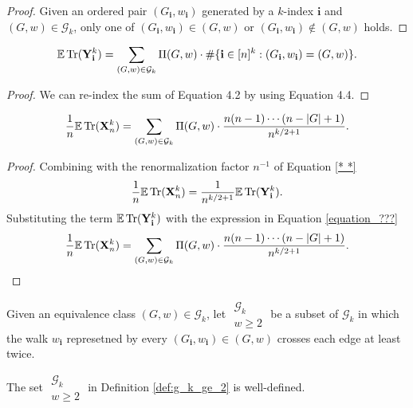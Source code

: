 \begin{proof}
  Given an ordered pair $(G_\mathbf{i},w_\mathbf{i})$ generated by a $k$-index $\mathbf{i}$ and $(G,w) \in \mathcal{G}_k$, 
  only one of $(G_\mathbf{i},w_\mathbf{i}) \in (G,w)$ or $(G_\mathbf{i},w_\mathbf{i}) \notin (G,w)$ holds. 
\end{proof}
\begin{lemma}
  \label{lem:equation_4.5_2}
  \[
  {\mathbb{E}} \operatorname{Tr} (\mathbf{Y}_\mathbf{i}^k) = \sum_{(G,w) \in \mathcal{G}_k} \Pi (G,w) \cdot \# \{ \mathbf{i} \in [n]^k : (G_\mathbf{i},w_\mathbf{i}) = (G,w) \}.
  \]
\end{lemma}
\begin{proof}
  We can re-index the sum of Equation 4.2 by using Equation 4.4.
\end{proof}
\begin{lemma}
  \label{lem:equation_4.5_3}
  \[
  \frac{1}{n} {\mathbb{E}} \operatorname{Tr} (\mathbf{X}_n^k) = \sum_{(G,w) \in \mathcal{G}_k} \Pi (G,w) \cdot \frac{n (n-1) \cdots (n - |G| + 1)}{n^{k/2+1}}.
  \]
\end{lemma}
\begin{proof}
  Combining with the renormalization factor $n^{-1}$ of Equation \ref{* *}
  \[
  \frac{1}{n} {\mathbb{E}} \operatorname{Tr} (\mathbf{X}_n^k) = \frac{1}{n^{k/2+1}} {\mathbb{E}} \operatorname{Tr} (\mathbf{Y}_\mathbf{i}^k).
  \]
  Substituting the term ${\mathbb{E}} \operatorname{Tr} (\mathbf{Y}_\mathbf{i}^k)$ with the expression in Equation \ref{equation_???}
  \[
  \frac{1}{n} {\mathbb{E}} \operatorname{Tr} (\mathbf{X}_n^k) = \sum_{\substack{(G,w) \in \mathcal{G}_k}} \Pi (G,w) \cdot \frac{n (n-1) \cdots (n - |G| + 1)}{n^{k/2+1}}.
  \]
\end{proof}
\begin{definition}
  \label{def:g_k_ge_2}
  Given an equivalence class $(G,w) \in \mathcal{G}_k$, 
  let $\substack{\mathcal{G}_k \\ w \geq 2}$ be a subset of $\mathcal{G}_k$ 
  in which the walk $w_\mathbf{i}$ represetned by every $(G_\mathbf{i},w_\mathbf{i}) \in (G,w)$ 
  crosses each edge at least twice.
\end{definition}
\begin{lemma}
  \label{lem:g_k_ge_2_wd}
  The set $\substack{\mathcal{G}_k \\ w \geq 2}$ in Definition \ref{def:g_k_ge_2} is well-defined.  
\end{lemma}
